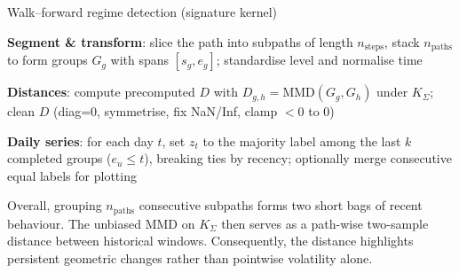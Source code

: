 \begin{algorithm}[H]
\caption{Walk--forward regime detection (signature kernel)}
\label{alg:wf_regime_simple2e}

\textbf{Segment \& transform}:
slice the path into subpaths of length $n_{\text{steps}}$, stack $n_{\text{paths}}$ to form groups $G_g$ with spans $[s_g,e_g]$; standardise level and normalise time

\textbf{Distances}:
compute precomputed $D$ with $D_{g,h}=\mathrm{MMD}(G_g,G_h)$ under $K_\Sigma$; clean $D$ (diag=0, symmetrise, fix NaN/Inf, clamp $<0$ to 0)


\textbf{Daily series}:
for each day $t$, set $z_t$ to the majority label among the last $k$ completed groups ($e_u\le t$), breaking ties by recency; optionally merge consecutive equal labels for plotting
\end{algorithm}

Overall, grouping $n_{\text{paths}}$ consecutive subpaths forms two short bags of recent behaviour. The unbiased MMD on $K_\Sigma$ then serves as a path-wise two-sample distance between historical windows. Consequently, the distance highlights persistent geometric changes rather than pointwise volatility alone.

